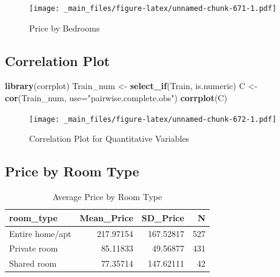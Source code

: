 \documentclass[]{book}
\newenvironment{Shaded}{\begin{snugshade}}{\end{snugshade}}
\newcommand{\KeywordTok}[1]{\textcolor[rgb]{0.13,0.29,0.53}{\textbf{#1}}}
\newcommand{\DataTypeTok}[1]{\textcolor[rgb]{0.13,0.29,0.53}{#1}}
\newcommand{\StringTok}[1]{\textcolor[rgb]{0.31,0.60,0.02}{#1}}
\newcommand{\OperatorTok}[1]{\textcolor[rgb]{0.81,0.36,0.00}{\textbf{#1}}}
\newcommand{\NormalTok}[1]{#1}
\begin{document}
\begin{figure}
\centering
\texttt{[image: \_main\_files/figure-latex/unnamed-chunk-671-1.pdf]}
\caption{\label{fig:unnamed-chunk-671}Price by Bedrooms}
\end{figure}

\subsection{Correlation Plot}\label{correlation-plot}

\begin{Shaded}
\begin{Highlighting}[]
\KeywordTok{library}\NormalTok{(corrplot)}
\NormalTok{Train_num <-}\StringTok{ }\KeywordTok{select_if}\NormalTok{(Train, is.numeric)}
\NormalTok{C <-}\StringTok{ }\KeywordTok{cor}\NormalTok{(Train_num, }\DataTypeTok{use=}\StringTok{"pairwise.complete.obs"}\NormalTok{)}
\KeywordTok{corrplot}\NormalTok{(C)}
\end{Highlighting}
\end{Shaded}

\begin{figure}
\centering
\texttt{[image: \_main\_files/figure-latex/unnamed-chunk-672-1.pdf]}
\caption{\label{fig:unnamed-chunk-672}Correlation Plot for Quantitative
Variables}
\end{figure}

\subsection{Price by Room Type}\label{price-by-room-type}

\begin{Shaded}
\end{Shaded}

\begin{table}

\caption{\label{tab:unnamed-chunk-673}Average Price by Room Type}
\centering
\begin{tabular}[t]{l|r|r|r}
\hline
room\_type & Mean\_Price & SD\_Price & N\\
\hline
Entire home/apt & 217.97154 & 167.52817 & 527\\
\hline
Private room & 85.11833 & 49.56877 & 431\\
\hline
Shared room & 77.35714 & 147.62111 & 42\\
\hline
\end{tabular}
\end{table}
\end{document}
